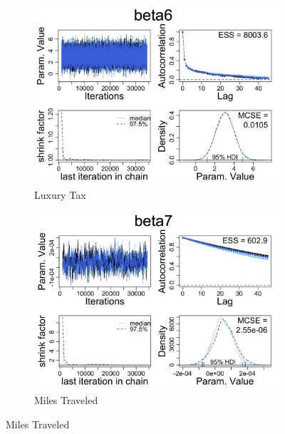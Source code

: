 \documentclass[12pt,english]{article}
\begin{document}
\begin{figure}[h]
 
\begin{subfigure}{0.5\textwidth}
\includegraphics[scale = 0.25]{beta6.png} 
\caption{Luxury Tax}
\label{fig:beta0}
\end{subfigure}
\begin{subfigure}{0.5\textwidth}
\includegraphics[scale = 0.25]{beta7.png}
\caption{Miles Traveled}
\label{fig:subim2}
\end{subfigure}
\label{fig:beta1}
\end{figure}
\end{document}
